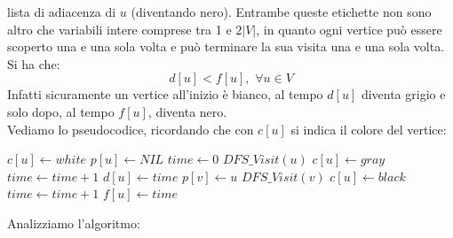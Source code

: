 \documentclass[a4paper,12pt, oneside]{book}
\begin{document}
lista di adiacenza di $u$ (diventando nero). Entrambe queste etichette
non sono altro che variabili intere comprese tra 1 e $2|V|$, in quanto
ogni vertice può essere scoperto una e una sola volta e può terminare
la sua visita una e una sola volta. Si ha che:
\[d[u]<f[u],\,\,\forall u\in V\]
Infatti sicuramente un vertice all'inizio è bianco, al tempo $d[u]$
diventa grigio e solo dopo, al tempo $f[u]$, diventa nero.\\
Vediamo lo pseudocodice, ricordando che con $c[u]$ si indica il colore
del vertice:
\begin{algorithm}
  \begin{algorithmic}[1]
    \State $c[u]\gets white$
    \State $p[u]\gets NIL$
    \EndFor
    \State $time \gets 0$
    \State $DFS\_Visit(u)$
    \EndIf
    \EndFor
    \EndFunction
    \State
    \State $c[u] \gets gray$
    \State $time \gets time +1$
    \State $d[u] \gets time$
    \State $p[v] \gets u$
    \State $DFS\_Visit(v)$
    \EndIf
    \EndFor
    \State $c[u] \gets black$
    \State $time \gets time +1$
    \State $f[u] \gets time$
    \EndFunction
  \end{algorithmic}
\end{algorithm}
Analizziamo l'algoritmo:
\end{document}
